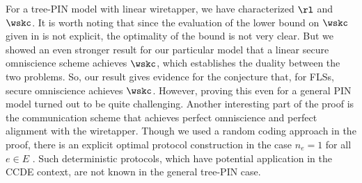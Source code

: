 For a tree-PIN model with linear wiretapper, we have characterized $\rl$ and $\wskc$. It is worth noting that since the evaluation of the lower bound on $\wskc$ given in \cite[Th. 7]{aminsource} is not explicit, the optimality of the bound is not very clear. But we showed an even stronger result for our particular model that a linear secure omniscience scheme achieves $\wskc$, which establishes the duality between the two problems. So, our result gives evidence for the conjecture that, for FLSs, secure omniscience achieves $\wskc$. However, proving this even for a general PIN model turned out to be quite challenging. Another interesting part of the proof is the communication scheme that achieves perfect omniscience and perfect alignment with the wiretapper. Though we used a random coding approach in the proof, there is an explicit optimal protocol construction in the case $n_e=1$ for all $e \in E$ \cite[Sec. V]{treepin21arxiv}. Such deterministic protocols, which have potential application in the CCDE context, are not known in the general tree-PIN case. 
